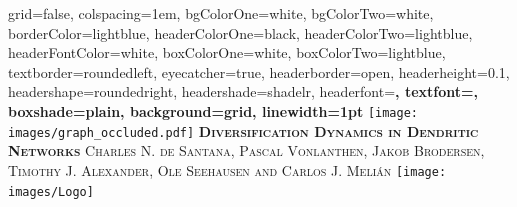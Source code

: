 \documentclass[10pt,landscape,final,a0paper,fontscale=0.285]{baposter}
\begin{document}
\begin{poster}
  {
  grid=false,
  colspacing=1em,
  bgColorOne=white,
  bgColorTwo=white,
  borderColor=lightblue,
  headerColorOne=black,
  headerColorTwo=lightblue,
  headerFontColor=white,
  boxColorOne=white,
  boxColorTwo=lightblue,
  textborder=roundedleft,
  eyecatcher=true,
  headerborder=open,
  headerheight=0.1\textheight,
  headershape=roundedright,
  headershade=shadelr,
  headerfont=\Large\bf\textsc, %
  textfont={\setlength{\parindent}{1.5em}},
  boxshade=plain,
  background=grid,
  linewidth=1pt
  }
  {\texttt{[image: images/graph\_occluded.pdf]}} 
  {\bf\textsc{Diversification Dynamics in Dendritic Networks}\vspace{0.5em}}
  {\textsc{Charles N. de Santana, Pascal Vonlanthen, Jakob Brodersen, Timothy J. Alexander, Ole Seehausen and Carlos J. Meli\'an}}
  {%
    \texttt{[image: images/Logo]}
  }

    \newcommand{\colouredcircle}{%
      \tikz{\useasboundingbox (-0.2em,-0.32em) rectangle(0.2em,0.32em); \draw[draw=black,fill=lightblue,line width=0.03em] (0,0) circle(0.18em);}}


\end{poster}
\end{document}
